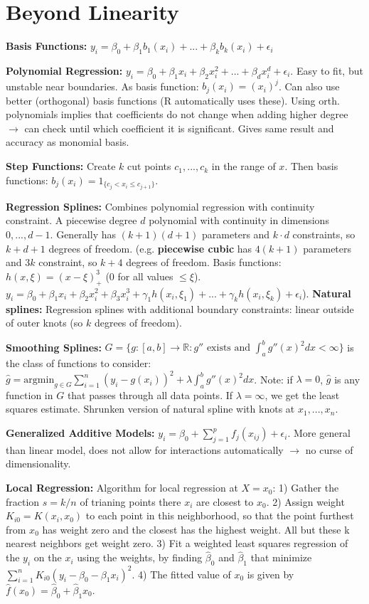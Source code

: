 \section*{Beyond Linearity}
\textbf{Basis Functions:} $y_i = \beta_0 + \beta_1 b_1(x_i) + ... + \beta_k b_k(x_i) + \epsilon_i$

\textbf{Polynomial Regression:}
$y_i=\beta_0+\beta_1 x_i + \beta_2 x_i^2 +...+\beta_d x_i^d + \epsilon_i$.
Easy to fit, but unstable near boundaries.
As basis function: $b_j(x_i) = (x_i)^j$.
Can also use better (orthogonal) basis functions (R automatically uses these). Using orth. polynomials implies that coefficients do not change when adding higher degree $\rightarrow$ can check until which coefficient it is significant. Gives same result and accuracy as monomial basis.

\textbf{Step Functions:}
Create $k$ cut points $c_1,...,c_k$ in the range of $x$. Then basis functions: $b_j(x_i) = \mathds{}{1}_{\{ c_j < x_i \leq c_{j+1}\}}$.

\textbf{Regression Splines:}
Combines polynomial regression with continuity constraint.
A piecewise degree $d$ polynomial with continuity in dimensions $0, ..., d-1$.
Generally has $(k+1)(d+1)$ parameters and $k\cdot d$ constraints, so $k+d+1$ degrees of freedom.
(e.g. \textbf{piecewise cubic} has $4(k+1)$ parameters and $3k$ constraint, so $k+4$ degrees of freedom. Basis functions: $h(x, \xi)=(x-\xi)_+^3$
($0$ for all values $\leq \xi$). $y_i = \beta_0 + \beta_1 x_i + \beta_2 x_i^2 + \beta_3 x_i^3 + \gamma_1 h(x_i, \xi_1) + ... + \gamma_k h(x_i, \xi_k) + \epsilon_i$).
\textbf{Natural splines:} Regression splines with additional boundary constraints: linear outside of outer knots (so $k$ degrees of freedom).

\textbf{Smoothing Splines:} $G=\{ g:[a,b]\to \mathbb{R}: g'' \text{ exists and } \int_a^b g''(x)^2 dx < \infty \}$ is the class of functions to consider: $\hat g = \text{argmin}_{g\in G} \sum_{i=1}^n (y_i - g(x_i))^2 + \lambda \int_a^b g''(x)^2 dx$.
Note: if $\lambda = 0$, $\hat g$ is any function in $G$ that passes through all data points. If $\lambda=\infty$, we get the least squares estimate. Shrunken version of natural spline with knots at $x_1, ..., x_n$.

\textbf{Generalized Additive Models:} $y_i = \beta_0 + \sum_{j=1}^p f_j(x_{ij}) + \epsilon_i$. More general than linear model, does not allow for interactions automatically $\to$ no curse of dimensionality.

\textbf{Local Regression:} Algorithm for local regression at $X=x_0$: 1) Gather the fraction $s=k/n$ of trianing points there $x_i$ are closest to $x_0$. 2) Assign weight $K_{i0}=K(x_i, x_0)$ to each point in this neighborhood, so that the point furthest from $x_0$ has weight zero and the closest has the highest weight. All but these k nearest neighbors get weight zero. 3) Fit a weighted least squares regression of the $y_i$ on the $x_i$ using the weights, by finding $\hat\beta_0$ and $\hat\beta_1$ that minimize $\sum_{i=1}^n K_{i0}(y_i-\beta_0-\beta_1 x_i)^2$. 4) The fitted value of $x_0$ is given by $\hat f (x_0) = \hat\beta_0 + \hat\beta_1 x_0$.

